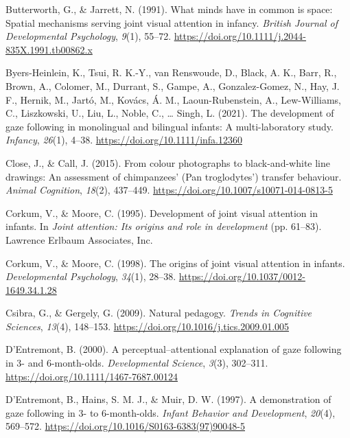 \documentclass[
]{scrbook}
\newlength{\cslhangindent}
\newenvironment{CSLReferences}[2] %
 {\begin{list}{}{%
  \setlength{\itemindent}{0pt}
  \setlength{\leftmargin}{0pt}
  \setlength{\parsep}{0pt}
  \ifodd #1
   \setlength{\leftmargin}{\cslhangindent}
   \setlength{\itemindent}{-1\cslhangindent}
  \fi
  \setlength{\itemsep}{#2\baselineskip}}}
 {\end{list}}
\begin{document}
\begin{CSLReferences}{1}{0}
Butterworth, G., \& Jarrett, N. (1991). What minds have in common is space: {Spatial} mechanisms serving joint visual attention in infancy. \emph{British Journal of Developmental Psychology}, \emph{9}(1), 55--72. \url{https://doi.org/10.1111/j.2044-835X.1991.tb00862.x}

Byers-Heinlein, K., Tsui, R. K.-Y., van Renswoude, D., Black, A. K., Barr, R., Brown, A., Colomer, M., Durrant, S., Gampe, A., Gonzalez-Gomez, N., Hay, J. F., Hernik, M., Jartó, M., Kovács, Á. M., Laoun-Rubenstein, A., Lew-Williams, C., Liszkowski, U., Liu, L., Noble, C., \ldots{} Singh, L. (2021). The development of gaze following in monolingual and bilingual infants: {A} multi-laboratory study. \emph{Infancy}, \emph{26}(1), 4--38. \url{https://doi.org/10.1111/infa.12360}

Close, J., \& Call, J. (2015). From colour photographs to black-and-white line drawings: An assessment of chimpanzees' ({Pan} troglodytes') transfer behaviour. \emph{Animal Cognition}, \emph{18}(2), 437--449. \url{https://doi.org/10.1007/s10071-014-0813-5}

Corkum, V., \& Moore, C. (1995). Development of joint visual attention in infants. In \emph{Joint attention: {Its} origins and role in development} (pp. 61--83). Lawrence Erlbaum Associates, Inc.

Corkum, V., \& Moore, C. (1998). The origins of joint visual attention in infants. \emph{Developmental Psychology}, \emph{34}(1), 28--38. \url{https://doi.org/10.1037/0012-1649.34.1.28}

Csibra, G., \& Gergely, G. (2009). Natural pedagogy. \emph{Trends in Cognitive Sciences}, \emph{13}(4), 148--153. \url{https://doi.org/10.1016/j.tics.2009.01.005}

D'Entremont, B. (2000). A perceptual--attentional explanation of gaze following in 3- and 6-month-olds. \emph{Developmental Science}, \emph{3}(3), 302--311. \url{https://doi.org/10.1111/1467-7687.00124}

D'Entremont, B., Hains, S. M. J., \& Muir, D. W. (1997). A demonstration of gaze following in 3- to 6-month-olds. \emph{Infant Behavior and Development}, \emph{20}(4), 569--572. \url{https://doi.org/10.1016/S0163-6383(97)90048-5}


\end{CSLReferences}
\end{document}
